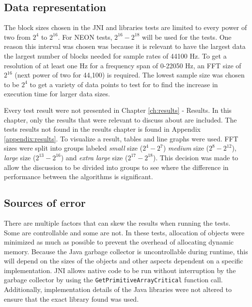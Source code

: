 
\subsection{Data representation}
The block sizes chosen in the JNI and libraries tests are limited to every power of two from $2^4$ to $2^{16}$. For NEON tests, $2^{16} - 2^{18}$ will be used for the tests. One reason this interval was chosen was because it is relevant to have the largest data the largest number of blocks needed for sample rates of 44100 Hz. To get a resolution of at least one Hz for a frequency span of 0-22050 Hz, an FFT size of $2^{16}$ (next power of two for 44,100) is required. The lowest sample size was chosen to be $2^{4}$ to get a variety of data points to test for to find the increase in execution time for larger data sizes.

Every test result were not presented in Chapter \ref{ch:results} - Results. In this chapter, only the results that were relevant to discuss about are included. The tests results not found in the results chapter is found in Appendix \ref{appendix:results}. To visualize a result, tables and line graphs were used. FFT sizes were split into groups labeled \emph{small} size ($2^{4} - 2^{7}$) \emph{medium} size ($2^{8} - 2^{12}$), \emph{large} size ($2^{13} - 2^{16}$) and \emph{extra large} size ($2^{17} - 2^{18}$). This decision was made to allow the discussion to be divided into groups to see where the difference in performance between the algorithms is significant.


\subsection{Sources of error}
There are multiple factors that can skew the results when running the tests. Some are controllable and some are not. In these tests, allocation of objects were minimized as much as possible to prevent the overhead of allocating dynamic memory. Because the Java garbage collector is uncontrollable during runtime, this will depend on the sizes of the objects and other aspects dependent on a specific implementation. JNI allows native code to be run without interruption by the garbage collector by using the \texttt{GetPrimitiveArrayCritical} function call. Additionally, implementation details of the Java libraries were not altered to ensure that the exact library found was used.

